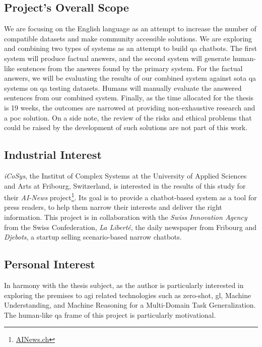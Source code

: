 \subsection{Project's Overall Scope}
We are focusing on the English language as an attempt to increase the number of compatible datasets and make community accessible solutions. We are exploring and combining two types of systems as an attempt to build \gls{qa} chatbots. The first system will produce factual answers, and the second system will generate human-like sentences from the answers found by the primary system. For the factual answers, we will be evaluating the results of our combined system against \gls{sota} \gls{qa} systems on \gls{qa} testing datasets. Humans will manually evaluate the answered sentences from our combined system. Finally, as the time allocated for the thesis is 19 weeks, the outcomes are narrowed at providing non-exhaustive research and a \gls{poc} solution. On a side note, the review of the risks and ethical problems that could be raised by the development of such solutions are not part of this work.


\subsection{Industrial Interest}
\label{intro:icosys}
\textit{iCoSys}, the Institut of Complex Systems at the University of Applied Sciences and Arts at Fribourg, Switzerland, is interested in the results of this study for their \textit{AI-News} project\footnote{\url{AINews.ch}}. Its goal is to provide a chatbot-based system as a tool for press readers, to help them narrow their interests and deliver the right information. This project is in collaboration with the \textit{Swiss Innovation Agency} from the Swiss Confederation, \textit{La Liberté}, the daily newspaper from Fribourg and \textit{Djebots}, a startup selling scenario-based narrow chatbots.

\subsection{Personal Interest}
In harmony with the thesis subject, as the author is particularly interested in exploring the premises to \gls{agi} related technologies such as \gls{zero-shot}, \gls{gl}, Machine Understanding, and Machine Reasoning for a Multi-Domain Task Generalization. The human-like \gls{qa} frame of this project is particularly motivational.

